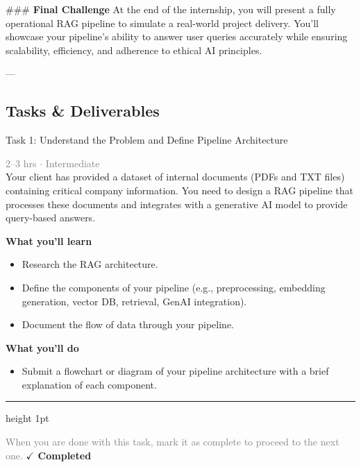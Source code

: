 \documentclass[10pt,a4paper]{article}
\begin{document}
\#\#\# \textbf{Final Challenge}  
At the end of the internship, you will present a fully operational RAG pipeline to simulate a real-world project delivery. You'll showcase your pipeline's ability to answer user queries accurately while ensuring scalability, efficiency, and adherence to ethical AI principles.

---

\subsection*{Tasks \& Deliverables}

\begin{taskbox}{Task 1: Understand the Problem and Define Pipeline Architecture}

    {\small \textcolor{gray}{2--3 hrs $\cdot$ Intermediate}}\\[12pt]

     Your client has provided a dataset of internal documents (PDFs and TXT files) containing critical company information. You need to design a RAG pipeline that processes these documents and integrates with a generative AI model to provide query-based answers.  


\vspace{8pt}
{\large \textbf{\textcolor{brandLight}{What you'll learn}}}\\[4pt]  
\begin{itemize}
    \item Research the RAG architecture.  
    \item Define the components of your pipeline (e.g., preprocessing, embedding generation, vector DB, retrieval, GenAI integration).  
    \item Document the flow of data through your pipeline.  
\end{itemize}

\vspace{8pt}
{\large \textbf{\textcolor{brandLight}{What you'll do}}}\\[4pt]  
\begin{itemize}
    \item Submit a flowchart or diagram of your pipeline architecture with a brief explanation of each component.\par
\end{itemize}

    \vspace{16pt}

    \textcolor{cardBorder}{\hrule height 1pt}\vspace{8pt}

    \small \textcolor{gray}{When you are done with this task, mark it as complete to proceed to the next one.} \hfill \textbf{\textcolor{brandDark}{$\checkmark$ Completed}}

\end{taskbox}
\end{document}
